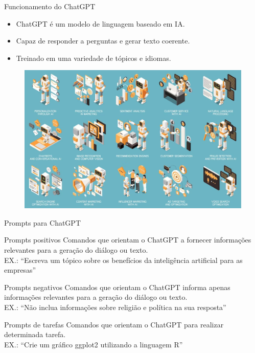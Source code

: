 \documentclass{beamer}
\begin{document}
\begin{frame}{Funcionamento do ChatGPT}
\begin{itemize}
\item ChatGPT é um modelo de linguagem baseado em IA.
\item Capaz de responder a perguntas e gerar texto coerente.
\item Treinado em uma variedade de tópicos e idiomas.
\end{itemize}
\begin{figure}
    \centering
    \includegraphics[scale=0.35]{figuras/funcoes.png}
\end{figure}
\end{frame}

\begin{frame}{Prompts para ChatGPT}
\begin{block}{Prompts positivos}
Comandos que orientam o ChatGPT a fornecer informações relevantes para a geração do diálogo ou texto.\\
EX.: ``Escreva um tópico sobre os benefícios da inteligência artificial para as empresas''
\end{block}
\pause
\begin{block}{Prompts negativos}
Comandos que orientam o ChatGPT informa apenas informações relevantes para a geração do diálogo ou texto.\\
EX.: ``Não inclua informações sobre religião e política na sua resposta''
\end{block}

\pause
\begin{block}{Prompts de tarefas}
Comandos que orientam o ChatGPT para realizar determinada tarefa.\\
EX.: ``Crie um gráfico ggplot2 utilizando a linguagem R''
\end{block}

\end{frame}
\end{document}
